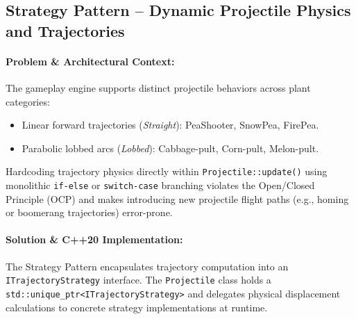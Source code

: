 \documentclass[12pt,a4paper]{article}
\begin{document}
\subsection{Strategy Pattern -- Dynamic Projectile Physics and Trajectories}

\paragraph{Problem \& Architectural Context:}
The gameplay engine supports distinct projectile behaviors across plant categories:
\begin{itemize}
    \item Linear forward trajectories (\textit{Straight}): PeaShooter, SnowPea, FirePea.
    \item Parabolic lobbed arcs (\textit{Lobbed}): Cabbage-pult, Corn-pult, Melon-pult.
\end{itemize}
Hardcoding trajectory physics directly within \texttt{Projectile::update()} using monolithic \texttt{if-else} or \texttt{switch-case} branching violates the Open/Closed Principle (OCP) and makes introducing new projectile flight paths (e.g., homing or boomerang trajectories) error-prone.

\paragraph{Solution \& C++20 Implementation:}
The Strategy Pattern encapsulates trajectory computation into an \texttt{ITrajectoryStrategy} interface. The \texttt{Projectile} class holds a \texttt{std::unique\_ptr<ITrajectoryStrategy>} and delegates physical displacement calculations to concrete strategy implementations at runtime.

\begin{center}
\end{center}
\end{document}
